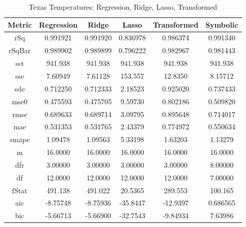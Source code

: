 \documentclass{article}
\begin{document}
\begin{table}[h]
\centering
\caption{Texas Temperatures: Regression, Ridge, Lasso, Transformed}
\label{tab:Texas-Temps}
\begin{tabular}{|c|c|c|c|c|c|} \hline 
Metric & Regression & Ridge & Lasso & Transformed & Symbolic \\ \hline \hline 
rSq &0.991921 &	0.991920 &	0.836978 &	0.986374 &	0.991340 \\ \hline 
rSqBar &0.989902 &	0.989899 &	0.796222 &	0.982967 &	0.981443 \\ \hline 
sst &941.938 &	941.938 &	941.938 &	941.938 &	941.938 \\ \hline 
sse &7.60949 &	7.61128 &	153.557 &	12.8350 &	8.15712 \\ \hline 
sde &0.712250 &	0.712333 &	2.18523 &	0.925020 &	0.737433 \\ \hline 
mse0 &0.475593 &	0.475705 &	9.59730 &	0.802186 &	0.509820 \\ \hline 
rmse &0.689633 &	0.689714 &	3.09795 &	0.895648 &	0.714017 \\ \hline 
mae &0.531353 &	0.531765 &	2.43379 &	0.774972 &	0.550634 \\ \hline 
smape &1.09478 &	1.09563 &	5.33198 &	1.63203 &	1.13279 \\ \hline 
m &16.0000 &	16.0000 &	16.0000 &	16.0000 &	16.0000 \\ \hline 
dfr &3.00000 &	3.00000 &	3.00000 &	3.00000 &	8.00000 \\ \hline 
df &12.0000 &	12.0000 &	12.0000 &	12.0000 &	7.00000 \\ \hline 
fStat &491.138 &	491.022 &	20.5365 &	289.553 &	100.165 \\ \hline 
aic &-8.75748 &	-8.75936 &	-35.8447 &	-12.9397 &	0.686565 \\ \hline 
bic &-5.66713 &	-5.66900 &	-32.7543 &	-9.84934 &	7.63986 \\ \hline 
\end{tabular}
\end{table}
\end{document}
